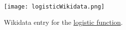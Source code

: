 \begin{figure}[tb]
  \centering
  \texttt{[image: logisticWikidata.png]}
  \caption{Wikidata entry for the \href{https://m.wikidata.org/w/index.php?oldid=723356182}{logistic function}.}
  \label{fg1}
\end{figure}
